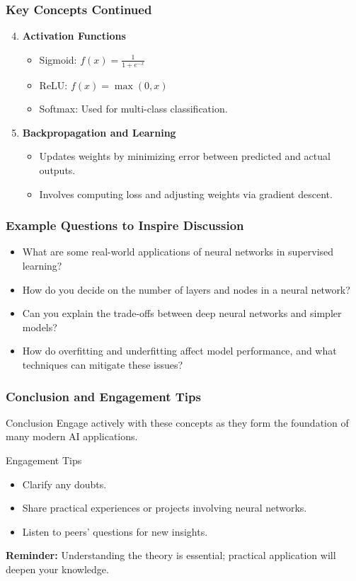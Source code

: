 \documentclass[aspectratio=169]{beamer}
\begin{document}
\begin{frame}[fragile]
  \frametitle{Key Concepts Continued}
  \begin{enumerate}
    \setcounter{enumi}{3} %
    \item \textbf{Activation Functions}
    \begin{itemize}
      \item Sigmoid: $f(x) = \frac{1}{1 + e^{-x}}$
      \item ReLU: $f(x) = \max(0, x)$
      \item Softmax: Used for multi-class classification.
    \end{itemize}

    \item \textbf{Backpropagation and Learning}
    \begin{itemize}
      \item Updates weights by minimizing error between predicted and actual outputs.
      \item Involves computing loss and adjusting weights via gradient descent.
    \end{itemize}
  \end{enumerate}
\end{frame}

\begin{frame}[fragile]
  \frametitle{Example Questions to Inspire Discussion}
  \begin{itemize}
    \item What are some real-world applications of neural networks in supervised learning?
    \item How do you decide on the number of layers and nodes in a neural network?
    \item Can you explain the trade-offs between deep neural networks and simpler models?
    \item How do overfitting and underfitting affect model performance, and what techniques can mitigate these issues?
  \end{itemize}
\end{frame}

\begin{frame}[fragile]
  \frametitle{Conclusion and Engagement Tips}
  \begin{block}{Conclusion}
    Engage actively with these concepts as they form the foundation of many modern AI applications.
  \end{block}
  
  \begin{block}{Engagement Tips}
    \begin{itemize}
      \item Clarify any doubts.
      \item Share practical experiences or projects involving neural networks.
      \item Listen to peers’ questions for new insights.
    \end{itemize}
  \end{block}

  \textbf{Reminder:} Understanding the theory is essential; practical application will deepen your knowledge.
\end{frame}
\end{document}

